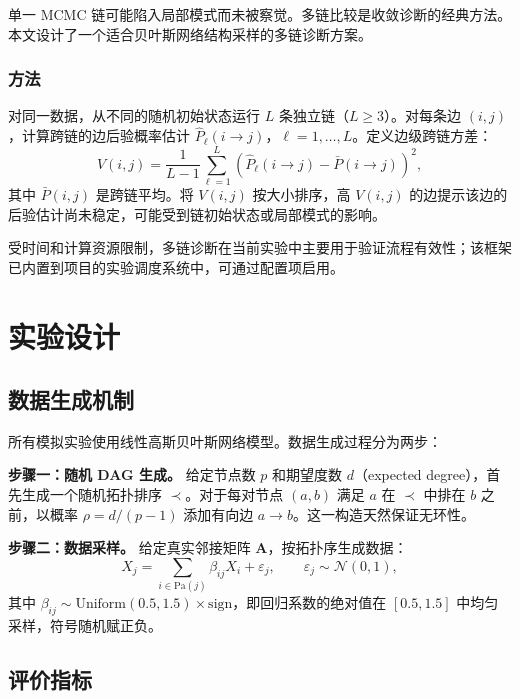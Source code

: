 \documentclass[UTF8,a4paper,12pt]{ctexart}
\begin{document}
单一 MCMC 链可能陷入局部模式而未被察觉。多链比较是收敛诊断的经典方法。本文设计了一个适合贝叶斯网络结构采样的多链诊断方案。

\subsubsection{方法}

对同一数据，从不同的随机初始状态运行 $L$ 条独立链（$L \geq 3$）。对每条边 $(i,j)$，计算跨链的边后验概率估计 $\hat{P}_{\ell}(i \to j)$，$\ell = 1, \ldots, L$。定义边级跨链方差：
\begin{equation}
V(i,j) = \frac{1}{L-1} \sum_{\ell=1}^{L} (\hat{P}_{\ell}(i \to j) - \bar{P}(i \to j))^2,
\end{equation}
其中 $\bar{P}(i,j)$ 是跨链平均。将 $V(i,j)$ 按大小排序，高 $V(i,j)$ 的边提示该边的后验估计尚未稳定，可能受到链初始状态或局部模式的影响。

受时间和计算资源限制，多链诊断在当前实验中主要用于验证流程有效性；该框架已内置到项目的实验调度系统中，可通过配置项启用。

\FloatBarrier
\newpage
\section{实验设计}

\subsection{数据生成机制}

所有模拟实验使用线性高斯贝叶斯网络模型。数据生成过程分为两步：

\textbf{步骤一：随机 DAG 生成。} 给定节点数 $p$ 和期望度数 $d$（expected degree），首先生成一个随机拓扑排序 $\prec$。对于每对节点 $(a, b)$ 满足 $a$ 在 $\prec$ 中排在 $b$ 之前，以概率 $\rho = d / (p-1)$ 添加有向边 $a \to b$。这一构造天然保证无环性。

\textbf{步骤二：数据采样。} 给定真实邻接矩阵 $\mathbf{A}$，按拓扑序生成数据：
\begin{equation}
X_j = \sum_{i \in \mathrm{Pa}(j)} \beta_{ij} X_i + \varepsilon_j, \qquad \varepsilon_j \sim \mathcal{N}(0, 1),
\end{equation}
其中 $\beta_{ij} \sim \text{Uniform}(0.5, 1.5) \times \text{sign}$，即回归系数的绝对值在 $[0.5, 1.5]$ 中均匀采样，符号随机赋正负。

\subsection{评价指标}
\end{document}
